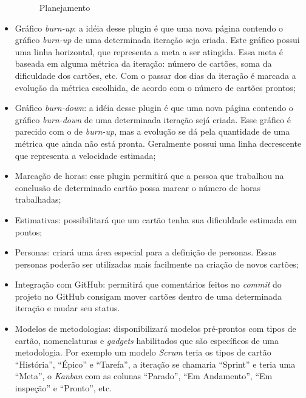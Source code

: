 \begin{itemize}
{	\begin{figure}[H]
	  \centering
	  \caption{Planejamento}\label{figura:planejamento}
	\end{figure}
	}
	\item{Gráfico \textit{burn-up}: a idéia desse plugin é que uma nova página contendo o gráfico \textit{burn-up} de uma determinada iteração seja criada. Este gráfico possui uma linha horizontal, que representa a meta a ser atingida. Essa meta é baseada em alguma métrica da iteração: número de cartões, soma da dificuldade dos cartões, etc. Com o passar dos dias da iteração é marcada a evolução da métrica escolhida, de acordo com o número de cartões prontos;}
	\item{Gráfico \textit{burn-down}: a idéia desse plugin é que uma nova página contendo o gráfico \textit{burn-down} de uma determinada iteração sejá criada. Esse gráfico é parecido com o de \textit{burn-up}, mas a evolução se dá pela quantidade de uma métrica que ainda não está pronta. Geralmente possui uma linha decrescente que representa a velocidade estimada;}
	\item{Marcação de horas: esse plugin permitirá que a pessoa que trabalhou na conclusão de determinado cartão possa marcar o número de horas trabalhadas;}
	\item{Estimativas: possibilitará que um cartão tenha sua dificuldade estimada em pontos;}
	\item{Personas: criará uma área especial para a definição de personas. Essas personas poderão ser utilizadas mais facilmente na criação de novos cartões;}
	\item{Integração com GitHub: permitirá que comentários feitos no \textit{commit} do projeto no GitHub consigam mover cartões dentro de uma determinada iteração e mudar seu status.}
	\item{Modelos de metodologias: disponibilizará modelos pré-prontos com tipos de cartão, nomenclaturas e \textit{gadgets} habilitados que são específicos de uma metodologia. Por exemplo um modelo \textit{Scrum} teria os tipos de cartão ``História'', ``Épico'' e ``Tarefa'', a iteração se chamaria ``Sprint'' e teria uma ``Meta'', o \textit{Kanban} com as colunas ``Parado'', ``Em Andamento'', ``Em inspeção'' e ``Pronto'', etc.}
\end{itemize}
